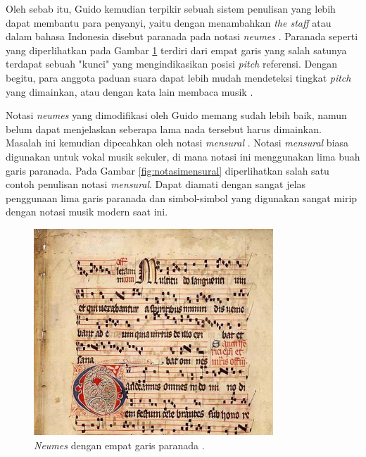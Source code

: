 Oleh sebab itu, Guido kemudian terpikir sebuah sistem penulisan yang lebih dapat membantu para penyanyi, yaitu dengan menambahkan \textit{the staff} atau dalam bahasa Indonesia disebut paranada pada notasi \textit{neumes} \cite{WQXR}. Paranada seperti yang diperlihatkan pada Gambar \ref{fig:neum4garis} terdiri dari empat garis yang salah satunya terdapat sebuah "kunci" yang mengindikasikan posisi \textit{pitch} referensi. Dengan begitu, para anggota paduan suara dapat lebih mudah mendeteksi tingkat \textit{pitch} yang dimainkan, atau dengan kata lain membaca musik \cite{WQXR}. \par
Notasi \textit{neumes} yang dimodifikasi oleh Guido memang sudah lebih baik, namun belum dapat menjelaskan seberapa lama nada tersebut harus dimainkan. Masalah ini kemudian dipecahkan oleh notasi \textit{mensural} \cite{WQXR}. Notasi \textit{mensural} biasa digunakan untuk vokal musik sekuler, di mana notasi ini menggunakan lima buah garis paranada. Pada Gambar \ref{fig:notasimensural} diperlihatkan salah satu contoh penulisan notasi \textit{mensural}. Dapat diamati dengan sangat jelas penggunaan lima garis paranada dan simbol-simbol yang digunakan sangat mirip dengan notasi musik modern saat ini. \par 
\begin{figure}[t!]
    \centering
    \includegraphics[width=9cm]{Gambar/Graduale_Aboense.jpg}
    \caption{\textit{Neumes} dengan empat garis paranada \cite{WQXR}.}
    \label{fig:neum4garis}
\end{figure}
